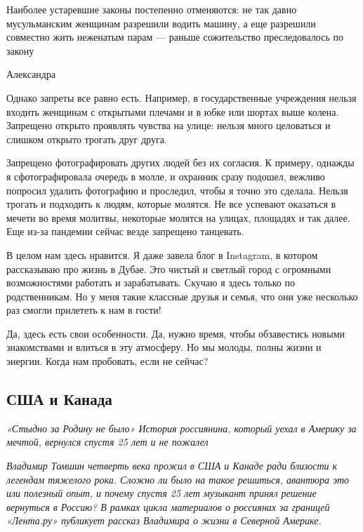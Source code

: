 \begin{fancyquotes}
    Наиболее устаревшие законы постепенно отменяются: не так давно мусульманским женщинам разрешили водить машину, а еще разрешили совместно жить неженатым парам — раньше сожительство преследовалось по закону

    \begin{flushright}
        Александра
    \end{flushright}
\end{fancyquotes}

Однако запреты все равно есть. Например, в государственные учреждения нельзя входить женщинам с открытыми плечами и в юбке или шортах выше колена. Запрещено открыто проявлять чувства на улице: нельзя много целоваться и слишком открыто трогать друг друга.

Запрещено фотографировать других людей без их согласия. К примеру, однажды я сфотографировала очередь в молле, и охранник сразу подошел, вежливо попросил удалить фотографию и проследил, чтобы я точно это сделала. Нельзя трогать и подходить к людям, которые молятся. Не все успевают оказаться в мечети во время молитвы, некоторые молятся на улицах, площадях и так далее. Еще из-за пандемии сейчас везде запрещено танцевать.

В целом нам здесь нравится. Я даже завела блог в Instagram, в котором рассказываю про жизнь в Дубае. Это чистый и светлый город с огромными возможностями работать и зарабатывать. Скучаю я здесь только по родственникам. Но у меня такие классные друзья и семья, что они уже несколько раз смогли прилететь к нам в гости!

Да, здесь есть свои особенности. Да, нужно время, чтобы обзавестись новыми знакомствами и влиться в эту атмосферу. Но мы молоды, полны жизни и энергии. Когда нам пробовать, если не сейчас?


\newpage
\subsection{США и Канада}

\textit{«Стыдно за Родину не было» История россиянина, который уехал в Америку за мечтой, вернулся спустя 25 лет и не пожалел}


\textit{Владимир Томшин четверть века прожил в США и Канаде ради близости к легендам тяжелого рока. Сложно ли было на такое решиться, авантюра это или полезный опыт, и почему спустя 25 лет музыкант принял решение вернуться в Россию? В рамках цикла материалов о россиянах за границей «Лента.ру» публикует рассказ Владимира о жизни в Северной Америке.}

